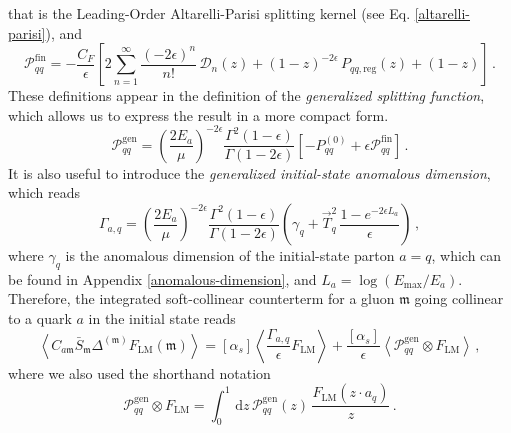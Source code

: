 \documentclass[a4paper, 12pt]{book}
\newcommand{\um}{\mathfrak{m}}
\begin{document}
that is the Leading-Order Altarelli-Parisi splitting kernel (see Eq. \ref{altarelli-parisi}), and
\begin{equation}
  \mathcal{P}_{qq}^{\mathrm{fin}}= - \frac{C_F}{\epsilon} \left[2 \sum_{n=1}^{\infty} \frac{(-2\epsilon)^n}{n!} \, \mathcal{D}_n(z)+(1-z)^{-2\epsilon} \, P_{qq, \mathrm{reg}}(z)+(1-z) \right] \, .
\end{equation}
These definitions appear in the definition of the \emph{generalized splitting function}, which allows us to express the result in a more compact form. 
\begin{equation}
  \mathcal{P}_{qq}^{\mathrm{gen}} = \left(\frac{2E_a}{\mu}\right)^{-2\epsilon} \frac{\Gamma^2(1-\epsilon)}{\Gamma(1-2\epsilon)} \left[-P^{(0)}_{qq}+\epsilon \mathcal{P}_{qq}^{\mathrm{fin}}\right] \, .
  \label{gen-splitt-funct}
\end{equation}
It is also useful to introduce the \emph{generalized initial-state anomalous dimension}, which reads
\begin{equation}
  \Gamma_{a,q} = \left(\frac{2E_a}{\mu}\right)^{-2\epsilon} \frac{\Gamma^2(1-\epsilon)}{\Gamma(1-2\epsilon)} \left(\gamma_q + \vec{T}_q^2 \,\frac{1-e^{-2\epsilon L_a}}{\epsilon}\right) \, ,
  \label{generalized-anom-dim-in}
\end{equation}
where $\gamma_q$ is the anomalous dimension of the initial-state parton $a=q$, which can be found in Appendix \ref{anomalous-dimension}, and $L_a =\log{(E_{\mathrm{max}}/E_a)}$. Therefore, the integrated soft-collinear counterterm for a gluon $\um$ going collinear to a quark $a$ in the initial state reads
\begin{equation}
  \left< C_{a\um} \bar{S}_\um \Delta^{(\um)} F_{\mathrm{LM}} (\um) \right> = [\alpha_s] \left< \frac{\Gamma_{a,q}}{\epsilon} F_{\mathrm{LM}} \right> + \frac{[\alpha_s]}{\epsilon}\left< \mathcal{P}_{qq}^{\mathrm{gen}} \otimes F_{\mathrm{LM}} \right> \, ,
  \label{initial-state-collinear}
\end{equation}
where we also used the shorthand notation
\begin{equation}
  \mathcal{P}_{qq}^{\mathrm{gen}} \otimes F_{\mathrm{LM}} = \int_0^1 \, \mathrm{d}z \, \mathcal{P}_{qq}^{\mathrm{gen}}(z) \, \frac{F_{\mathrm{LM}}(z \cdot a_q)}{z} \, .
  \label{convolution}
\end{equation}
\\
\end{document}
